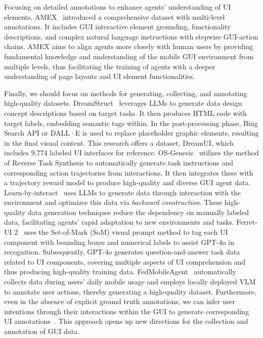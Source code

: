 Focusing on detailed annotations to enhance agents' understanding of UI elements, AMEX~\cite{chai2024amex} introduced a comprehensive dataset with multi-level annotations. It includes GUI interactive element grounding, functionality descriptions, and complex natural language instructions with stepwise GUI-action chains. AMEX aims to align agents more closely with human users by providing fundamental knowledge and understanding of the mobile GUI environment from multiple levels, thus facilitating the training of agents with a deeper understanding of page layouts and UI element functionalities.

Finally, we should focus on methods for generating, collecting, and annotating high-quality datasets. DreamStruct~\cite{peng2024dreamstruct} leverages LLMs to generate data design concept descriptions based on target tasks. It then produces HTML code with target labels, embedding semantic tags within. In the post-processing phase, Bing Search API or DALL·E is used to replace placeholder graphic elements, resulting in the final visual content. This research offers a dataset, DreamUI, which includes 9,774 labeled UI interfaces for reference. OS-Genesis~\cite{sun2024genesis} utilizes the method of Reverse Task Synthesis to automatically generate task instructions and corresponding action trajectories from interactions. It then integrates these with a trajectory reward model to produce high-quality and diverse GUI agent data. Learn-by-interact~\cite{su2025learn} uses LLMs to generate data through interaction with the environment and optimizes this data via \textit{backward construction}. These high-quality data generation techniques reduce the dependency on manually labeled data, facilitating agents' rapid adaptation to new environments and tasks. 
Ferret-UI 2~\cite{li2024ferretui2masteringuniversal} uses the Set-of-Mark (SoM) visual prompt method to tag each UI component with bounding boxes and numerical labels to assist GPT-4o in recognition. Subsequently, GPT-4o generates question-and-answer task data related to UI components, covering multiple aspects of UI comprehension and thus producing high-quality training data. FedMobileAgent~\cite{wang2025fedmobileagent} automatically collects data during users' daily mobile usage and employs locally deployed VLM to annotate user actions, thereby generating a high-quality dataset. Furthermore, even in the absence of explicit ground truth annotations, we can infer user intentions through their interactions within the GUI to generate corresponding UI annotations~\cite{berkovitch2024identifying}. This approach opens up new directions for the collection and annotation of GUI data.


